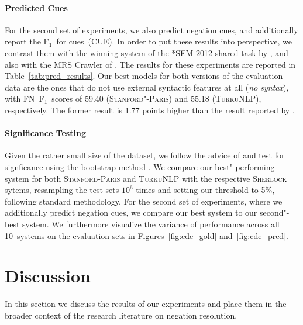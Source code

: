 \documentclass[11pt,a4paper]{article}
\theoremstyle{plain}
\def\fscore{F$_1$}
\begin{document}
\paragraph{Predicted Cues}

For the second set of experiments, we also predict negation cues, and
additionally report the \fscore\ for cues~(CUE).
In order to put these results into perspective, we contrast them with
the winning system of the *SEM 2012 shared task by
\citet{Rea:Vel:Ovr:12}, and also with the MRS Crawler of
\citet{Pac:Ben:Rea:14}.
The results for these experiments are reported in
Table~\ref{tab:pred_results}.
Our best models for both versions of the evaluation data are the ones that do not use external syntactic features at all (\emph{no syntax}), with FN~\fscore\ scores of 59.40 (\textsc{Stanford"-Paris}) and 55.18 (\textsc{TurkuNLP}), respectively.
The former result is 1.77 points higher than the result reported by \citet{Rea:Vel:Ovr:12}.

\paragraph{Significance Testing}

Given the rather small size of the dataset, we follow the advice of
\citet{dror2018hitchhiker} and test for signficance using  the bootstrap method
\citep{berg-kirkpatrick2012empirical}.
We compare our best"-performing system for both
\textsc{Stanford-Paris} and \textsc{TurkuNLP} with the respective
\textsc{Sherlock} sytems, resampling the test sets $10^6$ times and setting our
threshold to 5\%, following standard methodology.
For the second set of experiments, where we additionally predict
negation cues, we compare our best system to our second"-best system.
We furthermore visualize the variance of performance across all 10~systems on
the evaluation sets in Figures~\ref{fig:cde_gold}
and~\ref{fig:cde_pred}.

\section{Discussion}
\label{sec:discussion}

In this section we discuss the results of our experiments and place them in the broader context of the research literature on negation resolution.
\end{document}
